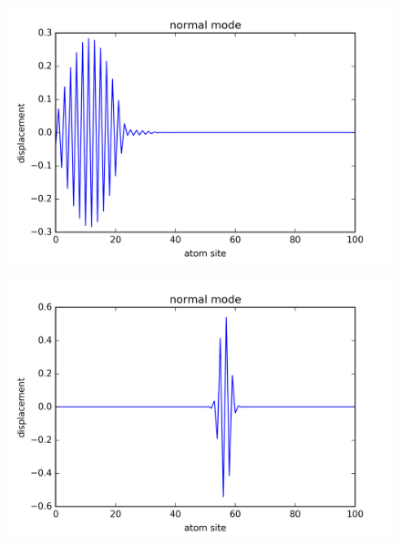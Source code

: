\begin{figure}[!htbh]
\centering
\begin{minipage}{.45\textwidth}
  \centering
  \includegraphics[width=1.1\linewidth]{Harmonic_spring_ratio/prob_spr_N_103sp_2_0p_0_1101th.png}
  \label{fig:prob_spring_N_103m_2p_0_1_101st}
\end{minipage}\qquad
\begin{minipage}{.45\textwidth}
  \centering
  \includegraphics[width=1.1\linewidth]{Harmonic_spring_ratio/prob_spr_N_103sp_2_0p_0_5101th.png}
  \label{fig:prob_spring_N_103m_2p_0_5_101st}
\end{minipage}
\end{figure}


\endinput